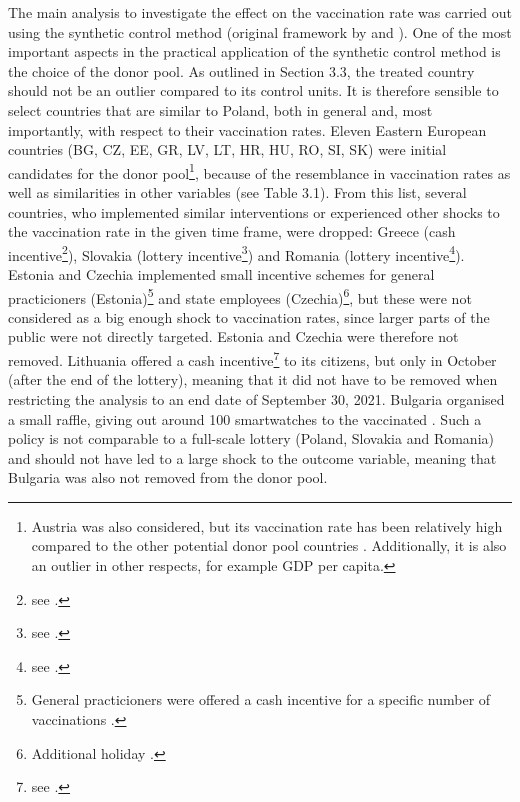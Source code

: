 \documentclass{scrbook}
\begin{document}
The main analysis to investigate the effect on the vaccination rate was
carried out using the synthetic control method (original framework by
\textcite{abadie_economic_2003} and \textcite{abadie_synthetic_2010}).
One of the most important aspects in the practical application of the
synthetic control method is the choice of the donor pool. As outlined in
Section 3.3, the treated country should not be an outlier compared to
its control units. It is therefore sensible to select countries that are
similar to Poland, both in general and, most importantly, with respect
to their vaccination rates. Eleven Eastern European countries (BG, CZ,
EE, GR, LV, LT, HR, HU, RO, SI, SK) were initial candidates for the
donor
pool\footnote{Austria was also considered, but its vaccination rate has been relatively high compared to the other potential donor pool countries \parencite{mathieu_global_2021}. Additionally, it is also an outlier in other respects, for example GDP per capita.},
because of the resemblance in vaccination rates as well as similarities
in other variables (see Table 3.1). From this list, several countries,
who implemented similar interventions or experienced other shocks to the
vaccination rate in the given time frame, were dropped: Greece (cash
incentive\footnote{see \textcite{koutantou_greece_2021}.}), Slovakia
(lottery incentive\footnote{see \textcite{lopatka_slovaks_2021}.}) and
Romania (lottery
incentive\footnote{see \textcite{health_ministry_of_romania_press_2021}.}).
Estonia and Czechia implemented small incentive schemes for general
practicioners
(Estonia)\footnote{General practicioners were offered a cash incentive for a specific number of vaccinations \parencite{baltic_news_network_estonia_2021}.}
and state employees
(Czechia)\footnote{Additional holiday \parencite{euronews_czech_2021}.},
but these were not considered as a big enough shock to vaccination
rates, since larger parts of the public were not directly targeted.
Estonia and Czechia were therefore not removed. Lithuania offered a cash
incentive\footnote{see \textcite{lithuanian_national_radio_and_television_lithuanian_2021}.}
to its citizens, but only in October (after the end of the lottery),
meaning that it did not have to be removed when restricting the analysis
to an end date of September 30, 2021. Bulgaria organised a small raffle,
giving out around 100 smartwatches to the vaccinated
\parencite{radio_bulgaria_bulgarias_2021}. Such a policy is not
comparable to a full-scale lottery (Poland, Slovakia and Romania) and
should not have led to a large shock to the outcome variable, meaning
that Bulgaria was also not removed from the donor pool.
\end{document}
